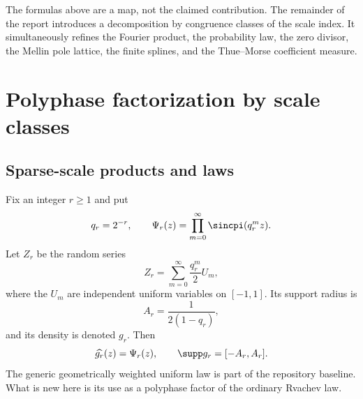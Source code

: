 \documentclass[11pt,oneside]{article}
\theoremstyle{definition}
\begin{document}
\begin{statusboxPartx}[Transition]
The formulas above are a map, not the claimed contribution.  The remainder of
the report introduces a decomposition by congruence classes of the scale index.
It simultaneously refines the Fourier product, the probability law, the zero
divisor, the Mellin pole lattice, the finite splines, and the Thue--Morse
coefficient measure.
\end{statusboxPartx}

\section{Polyphase factorization by scale classes}
\label{p2:sec:polyphase}

\subsection{Sparse-scale products and laws}

Fix an integer $r\ge1$ and put
\begin{equation}
 q_r=2^{-r},\qquad
 \Psi_r(z)=\prod_{m=0}^{\infty}\sincpi(q_r^m z).            \label{p2:eq:Psi-def}
\end{equation}
Let $Z_r$ be the random series
\begin{equation}
 Z_r=\sum_{m=0}^{\infty}\frac{q_r^m}{2}U_m,                \label{p2:eq:Zr-series}
\end{equation}
where the $U_m$ are independent uniform variables on $[-1,1]$.  Its support
radius is
\begin{equation}
 A_r=\frac1{2(1-q_r)},                                     \label{p2:eq:Ar}
\end{equation}
and its density is denoted $g_r$.  Then
\begin{equation}
 \widehat{g_r}(z)=\Psi_r(z),
 \qquad \supp g_r=[-A_r,A_r].                              \label{p2:eq:gr-Fourier-support}
\end{equation}
The generic geometrically weighted uniform law is part of the repository
baseline.  What is new here is its use as a polyphase factor of the ordinary
Rvachev law.
\end{document}
